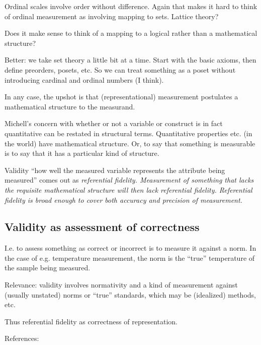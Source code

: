 \documentclass[11pt,twoside]{article}
\begin{document}
Ordinal scales involve order without difference.  Again that makes it
hard to think of ordinal measurement as involving mapping to sets.
Lattice theory?

Does it make sense to think of a mapping to a logical rather than a
mathematical structure?

Better: we take set theory a little bit at a time.  Start with the
basic axioms, then define preorders, posets, etc.  So we can treat
something as a poset without introducing cardinal and ordinal numbers
(I think).

In any case, the upshot is that (representational) measurement
postulates a mathematical structure to the measurand.

Michell's concern with whether or not a variable or construct is in
fact quantitative can be restated in structural terms.  Quantitative
properties etc. (in the world) have mathematical structure.  Or, to
say that something is measurable is to say that it has a particular
kind of structure.

Validity ``how well the measured variable represents the attribute
being measured'' comes out as \it{referential fidelity}.  Measurement
of something that lacks the requisite mathematical structure will then
lack referential fidelity.  Referential fidelity is broad enough to
cover both accuracy and precision of measurement.

\subsection{Validity as assessment of correctness}

I.e. to assess something as correct or incorrect is to measure it
against a norm.  In the case of e.g. temperature measurement, the norm
is the ``true'' temperature of the sample being measured.

Relevance: validity involves normativity and a kind of measurement
against (usually unstated) norms or ``true'' standards, which may be
(idealized) methods, etc.

Thus referential fidelity as correctness of representation.

\noindent References:

\noindent
\cite{chang_inventing_2004} \\
\cite{chang_measurement_2004} \\
\cite{chang_spirit_2004} \\
\cite{martin_counting_2009} \\
\cite{michell_normal_2000}\\
\cite{sherry_thermoscopes_2011}
\end{document}
